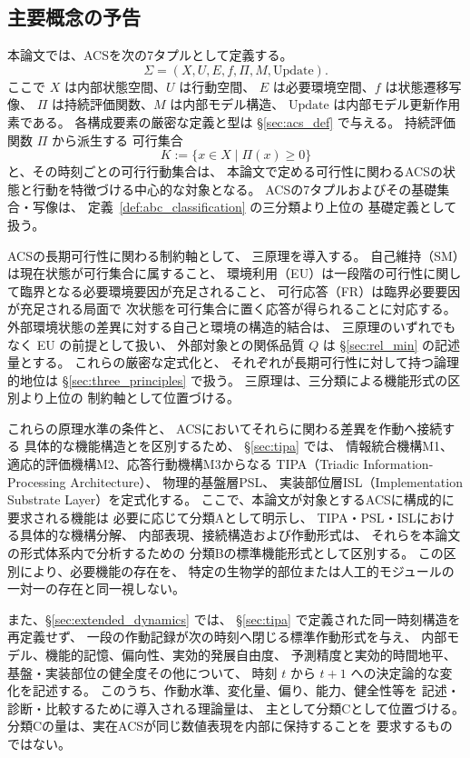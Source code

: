 \subsection{主要概念の予告}
\label{subsec:preview}

本論文では、ACSを次の7タプルとして定義する。
\[
\Sigma=(X,U,E,f,\Pi,M,\mathrm{Update}).
\]
ここで $X$ は内部状態空間、$U$ は行動空間、
$E$ は必要環境空間、$f$ は状態遷移写像、
$\Pi$ は持続評価関数、$M$ は内部モデル構造、
$\mathrm{Update}$ は内部モデル更新作用素である。
各構成要素の厳密な定義と型は
\S\ref{sec:acs_def} で与える。
持続評価関数 $\Pi$ から派生する
可行集合
\[
K:=\{x\in X\mid\Pi(x)\ge0\}
\]
と、その時刻ごとの可行行動集合は、
本論文で定める可行性に関わるACSの状態と行動を特徴づける中心的な対象となる。
ACSの7タプルおよびその基礎集合・写像は、
定義~\ref{def:abc_classification} の三分類より上位の
基礎定義として扱う。

ACSの長期可行性に関わる制約軸として、
三原理を導入する。
自己維持（SM）は現在状態が可行集合に属すること、
環境利用（EU）は一段階の可行性に関して臨界となる必要環境要因が充足されること、
可行応答（FR）は臨界必要要因が充足される局面で
次状態を可行集合に置く応答が得られることに対応する。
外部環境状態の差異に対する自己と環境の構造的結合は、
三原理のいずれでもなく EU の前提として扱い、
外部対象との関係品質 $Q$ は \S\ref{sec:rel_min} の記述量とする。
これらの厳密な定式化と、
それぞれが長期可行性に対して持つ論理的地位は
\S\ref{sec:three_principles} で扱う。
三原理は、三分類による機能形式の区別より上位の
制約軸として位置づける。

これらの原理水準の条件と、
ACSにおいてそれらに関わる差異を作動へ接続する
具体的な機能構造とを区別するため、
\S\ref{sec:tipa} では、
情報統合機構M1、適応的評価機構M2、応答行動機構M3からなる
TIPA（Triadic Information-Processing Architecture）、
物理的基盤層PSL、
実装部位層ISL（Implementation Substrate Layer）を定式化する。
ここで、本論文が対象とするACSに構成的に要求される機能は
必要に応じて分類Aとして明示し、
TIPA・PSL・ISLにおける具体的な機構分解、
内部表現、接続構造および作動形式は、
それらを本論文の形式体系内で分析するための
分類Bの標準機能形式として区別する。
この区別により、必要機能の存在を、
特定の生物学的部位または人工的モジュールの
一対一の存在と同一視しない。

また、\S\ref{sec:extended_dynamics} では、
\S\ref{sec:tipa} で定義された同一時刻構造を再定義せず、
一段の作動記録が次の時刻へ閉じる標準作動形式を与え、
内部モデル、機能的記憶、偏向性、実効的発展自由度、
予測精度と実効的時間地平、基盤・実装部位の健全度その他について、
時刻 $t$ から $t+1$ への決定論的な変化を記述する。
このうち、作動水準、変化量、偏り、能力、健全性等を
記述・診断・比較するために導入される理論量は、
主として分類Cとして位置づける。
分類Cの量は、実在ACSが同じ数値表現を内部に保持することを
要求するものではない。

